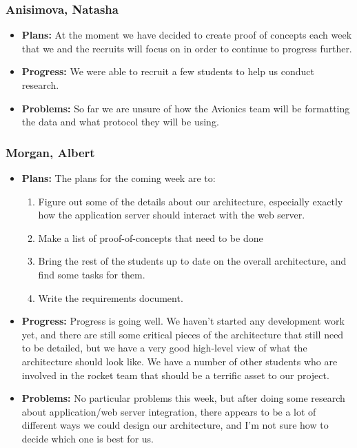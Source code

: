 \documentclass[10pt,draftclsnofoot,onecolumn]{IEEEtran}
\begin{document}
\subsubsection{Anisimova, Natasha}
\begin{itemize}
	\item \textbf{Plans: }
	At the moment we have decided to create proof of concepts each week that we and the recruits will
	focus on in order to continue to progress further.
	\item \textbf{Progress: }
	We were able to recruit a few students to help us conduct research.
	\item \textbf{Problems: }
	So far we are unsure of how the Avionics team will be formatting the data and what protocol they
	will be using.
\end{itemize}
\subsubsection{Morgan, Albert}
\begin{itemize}
	\item \textbf{Plans: }
	The plans for the coming week are to:

	\begin{enumerate}
		\item	Figure out some of the details about our architecture, especially exactly how the application server should interact with the web server.
		\item Make a list of proof-of-concepts that need to be done
		\item Bring the rest of the students up to date on the overall architecture, and find some tasks for them.
		\item Write the requirements document.
	\end{enumerate}
	\item \textbf{Progress: }
	Progress is going well. We haven't started any development work yet, and there are still some critical pieces of the architecture that still need to be detailed, but we have a very good high-level view of what the architecture should look like. We have a number of other students who are involved in the rocket team that should be a terrific asset to our project.
	\item \textbf{Problems: }
	No particular problems this week, but after doing some research about application/web server integration, there appears to be a lot of different ways we could design our architecture, and I'm not sure how to decide which one is best for us.
\end{itemize}
\end{document}

